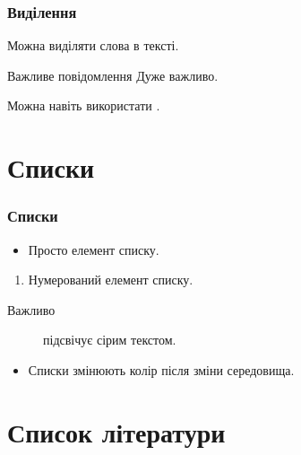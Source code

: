 \documentclass[ukrainian]{beamer}
\begin{document}
\begin{frame}
    \frametitle{Виділення}
    
    Можна \alert{виділяти} слова в тексті.
    
    \begin{alertblock}{Важливе повідомлення}
       \alert{Дуже} важливо.
    \end{alertblock}
    
    Можна навіть використати .
\end{frame}

\section{Списки}

\begin{frame}
    \frametitle{Списки}
    
    \begin{itemize}
        \item
        Просто елемент списку.
    \end{itemize}
    
    \begin{enumerate}
        \item
        Нумерований елемент списку.
    \end{enumerate}
    
    \begin{description}
        \item[Важливо]
        підсвічує сірим текстом.
    \end{description}
    
    \begin{example}
        \begin{itemize}
            \item
            Списки змінюють колір після зміни середовища.
        \end{itemize}
    \end{example}
\end{frame}

\section{Список літератури}
\end{document}
